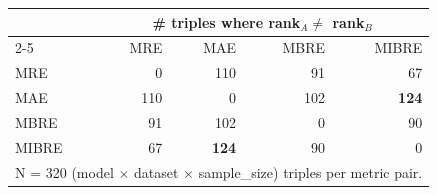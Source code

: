 \begin{tabular}{lrrrr}
\toprule
 & \multicolumn{4}{c}{\# triples where rank$_A \neq$ rank$_B$} \\
\cmidrule{2-5}
 & MRE & MAE & MBRE & MIBRE \\
\midrule
MRE & 0 & 110 & 91 & 67 \\
MAE & 110 & 0 & 102 & \textbf{124} \\
MBRE & 91 & 102 & 0 & 90 \\
MIBRE & 67 & \textbf{124} & 90 & 0 \\
\bottomrule
\multicolumn{5}{l}{\footnotesize N = 320 (model $\times$ dataset $\times$ sample\_size) triples per metric pair.}
\end{tabular}
